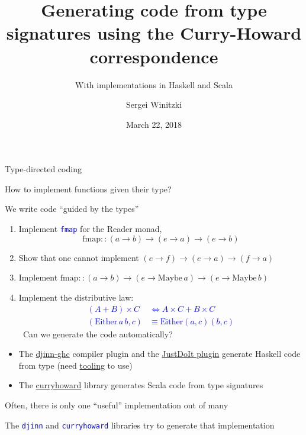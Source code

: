 \documentclass[english]{beamer}
\title[Generating code with Curry-Howard]{Generating code from type signatures
using the Curry-Howard correspondence}
\subtitle{With implementations in Haskell and Scala}
\author{Sergei Winitzki}
\date{March 22, 2018}
\institute[BAHUG]{Bay Area Haskell Users' Group}
\begin{document}
\frame{\titlepage}
\begin{frame}{Type-directed coding}

How to implement functions given their type?

We write code ``guided by the types''
\begin{enumerate}
\item Implement \texttt{\textcolor{blue}{\footnotesize{}fmap}} for the Reader
monad,{\footnotesize{}
\[
\text{fmap}::\left(a\rightarrow b\right)\rightarrow\left(e\rightarrow a\right)\rightarrow\left(e\rightarrow b\right)
\]
}{\footnotesize \par}
\item Show that one cannot implement{\footnotesize{} $\left(e\rightarrow f\right)\rightarrow\left(e\rightarrow a\right)\rightarrow\left(f\rightarrow a\right)$}{\footnotesize \par}
\item Implement {\footnotesize{}$\text{fmap}::\left(a\rightarrow b\right)\rightarrow\left(e\rightarrow\text{Maybe}\,a\right)\rightarrow\left(e\rightarrow\text{Maybe}\,b\right)$}{\footnotesize \par}
\item Implement the distributive law: \texttt{\textcolor{blue}{\footnotesize{}
\begin{align*}
\left(A+B\right)\times C & \Leftrightarrow A\times C+B\times C\\
(\text{Either}\,a\,b,c) & \equiv\text{Either}\left(a,c\right)\left(b,c\right)
\end{align*}
}}Can we generate the code automatically?
\end{enumerate}
\begin{itemize}
\item The \href{https://hackage.haskell.org/package/djinn-ghc}{djinn-ghc}
compiler plugin and the \href{https://github.com/nomeata/ghc-justdoit}{JustDoIt plugin}
generate Haskell code from type (need \href{https://github.com/serras/emacs-haskell-tutorial/blob/master/tutorial.md\#working-with-holes}{tooling}
to use)
\item The \href{https://github.com/Chymyst/curryhoward}{curryhoward} library
generates Scala code from type signatures
\end{itemize}
Often, there is only one ``useful'' implementation out of many

The \texttt{\textcolor{blue}{\footnotesize{}djinn}} and \texttt{\textcolor{blue}{\footnotesize{}curryhoward}}
libraries try to generate that implementation
\end{frame}
\end{document}
